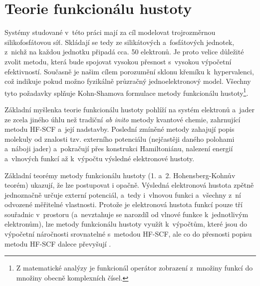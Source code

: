 \documentclass[
digital, %
table,   %
lof,     %
lot,     %
oneside,
]{fithesis3}
\begin{document}
\section{Teorie funkcionálu hustoty}
Systémy studované v~této práci mají za cíl modelovat trojrozměrnou silikofosfátovou síť. Skládají se tedy ze silikátových a~fosfátových jednotek, z~nichž na každou jednotku připadá cca. 50 elektronů. Je proto velice důležité zvolit metodu, která bude spojovat vysokou přesnost s~vysokou výpočetní efektivností. Současně je našim cílem porozumění sklonu křemíku k~hypervalenci, což indikuje pokud možno fyzikálně průzračný jednoelektronový model. Všechny tyto požadavky splňuje Kohn-Shamova formulace metody funkcionálu hustoty\footnote{Z matematické analýzy je funkcionál operátor zobrazení z~množiny funkcí do množiny obecně komplexních čísel.}\cite{Bickelhauptdftreview}.

Základní myšlenka teorie funkcionálu hustoty pohlíží na systém elektronů a~jader ze zcela jiného úhlu než tradiční \textit{ab inito} metody kvantové chemie, zahrnující metodu HF-SCF a~její nadstavby. Poslední zmíněné metody zahajují popis molekuly od znalosti tzv. externího potenciálu (nejčastěji daného polohami a~náboji jader) a~pokračují přes konstrukci Hamiltoniánu, nalezení energií a~vlnových funkcí až k~výpočtu výsledné elektronové hustoty.

Základní teorémy metody funkcionálu hustoty (1. a~2. Hohensberg-Kohnův teorém) ukazují, že lze postupovat i opačně. Výsledná elektronová hustota zpětně jednoznačně určuje externí potenciál, a~tedy i~vlnovou funkci a~všechny z~ní odvozené měřitelné vlastnosti. Protože je elektronová hustota funkcí pouze tří souřadnic v~prostoru (a~nevztahuje se narozdíl od vlnové funkce k~jednotlivým elektronům), lze metody funkcionálu hustoty využít k~výpočtům, které jsou do výpočetní náročnosti srovnatelné s~metodou HF-SCF, ale co do přesnosti popisu metodu HF-SCF dalece převyšují \cite{jensen2007introduction}.\\
\end{document}
